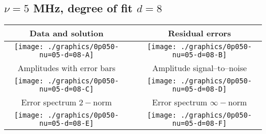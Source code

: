 

% 

\clearpage{}
\break{}

\subsection{$\nu = 5$ MHz, degree of fit $d = 8$}

\begin{table}[h]
    \begin{center}
        \begin{tabular}{ccc}
            Data and solution & \quad & Residual errors \\\hline
            \texttt{[image: ./graphics/0p050-nu=05-d=08-A]} &&
            \texttt{[image: ./graphics/0p050-nu=05-d=08-B]} \\[15pt]
            Amplitudes with error bars && Amplitude signal--to--noise \\\hline
            \texttt{[image: ./graphics/0p050-nu=05-d=08-C]} &&
            \texttt{[image: ./graphics/0p050-nu=05-d=08-D]} \\[15pt]
            Error spectrum $2-$norm && Error spectrum $\infty-$norm \\\hline
            \texttt{[image: ./graphics/0p050-nu=05-d=08-E]} &&
            \texttt{[image: ./graphics/0p050-nu=05-d=08-F]} \\[15pt]
        \end{tabular}
    \end{center}
\label{fig:elev=50, nu=5}
\end{table}



\endinput
